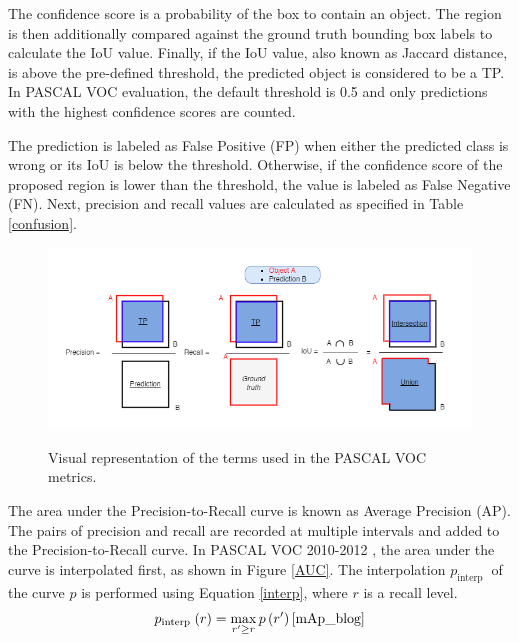 The confidence score is a probability of the box to contain an object. The region is then additionally compared against the ground truth bounding box labels to calculate the IoU value. Finally, if the IoU value, also known as Jaccard distance, is above the pre-defined threshold, the predicted object is considered to be a TP. In PASCAL VOC evaluation, the default threshold is 0.5 \cite{mAp_blog} and only predictions with the highest confidence scores are counted. 

The prediction is labeled as False Positive (FP) when either the predicted class is wrong or its IoU is below the threshold. Otherwise, if the confidence score of the proposed region is lower than the threshold, the value is labeled as False Negative (FN). Next, precision and recall values are calculated as specified in Table \ref{confusion}.


\begin{figure}[htb]
	\begin{center}
		\includegraphics[width=16cm]{./IOU.png}
	\end{center}
	\caption{Visual representation of the terms used in the PASCAL VOC metrics.}
	\begin{center}
		\label{iou}
	\end{center}
\end{figure}


The area under the Precision-to-Recall curve is known as Average Precision (AP). The pairs of precision and recall are recorded at multiple intervals and added to the Precision-to-Recall curve. In PASCAL VOC 2010-2012 \cite{Everingham10}, the area under the curve is interpolated first, as shown in Figure \ref{AUC}. The interpolation $p_{\text {interp }}$ of the curve $p$ is performed using Equation \ref{interp}, where $r$ is a recall level. 
\begin{equation}
p_{\text {interp }}(r)=\max _{r^{\prime} \geq r} p\left(r^{\prime}\right)
\label{interp}
\cite{mAp_blog}  
\end{equation}

